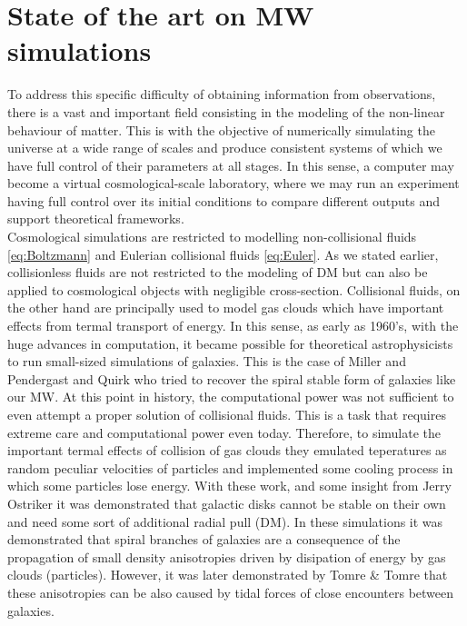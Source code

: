 \section{State of the art on MW simulations}
To address this specific difficulty of obtaining information from observations, there is a vast and important field consisting in the modeling of the non-linear behaviour of matter. 
This is with the objective of numerically simulating the universe at a wide range of scales and produce consistent systems of which we have  full control of their parameters at all stages. 
In this sense, a computer may become a virtual cosmological-scale laboratory, where we may run an experiment having full control over its initial conditions to compare different outputs and support theoretical frameworks. \\


Cosmological simulations are restricted to modelling non-collisional fluids \eqref{eq:Boltzmann} and Eulerian collisional fluids \eqref{eq:Euler}. As we stated earlier, collisionless fluids are not restricted to the modeling of DM but can also be applied to cosmological objects with negligible cross-section. Collisional fluids, on the other hand are principally used to model gas clouds which have important effects from termal transport of energy. In this sense, as early as 1960's, with the huge advances in computation, it became possible for theoretical astrophysicists to run small-sized simulations of galaxies. This is the case of Miller and Pendergast \cite{Miller and Pendergast} and Quirk \cite{MPQ} who tried to recover the spiral stable form of galaxies like our MW. At this point in history, the computational power was not sufficient to even attempt a proper solution of collisional fluids. This is a task that requires extreme care and computational power even today. Therefore, to simulate the important termal effects of collision of gas clouds they emulated teperatures as random peculiar velocities of particles and implemented some cooling process in which some particles lose energy. With these work, and some insight from Jerry Ostriker \cite{JO} it was demonstrated that galactic disks cannot be stable on their own and need some sort of additional radial pull (DM). In these simulations it was demonstrated that spiral branches of galaxies are a consequence of the propagation of small density anisotropies driven by disipation of energy by gas clouds (particles). However, it was later demonstrated by Tomre \& Tomre \cite{Tomre y Tomre} that these anisotropies can be also caused by tidal forces of close encounters between galaxies.\\

